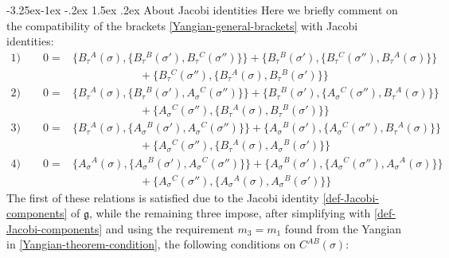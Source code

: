 \documentclass[12pt]{article}
\makeatletter
\renewcommand\subsection{\@startsection{subsection}{2}{\z@}%
                                     {-3.25ex\@plus -1ex \@minus -.2ex}%
                                     {1.5ex \@plus .2ex}%
                                     {\normalfont\bfseries}}
\numberwithin{equation}{section}
\makeatother
\begin{document}
\subsection{About Jacobi identities}
Here we briefly comment on the compatibility of the brackets \eqref{Yangian-general-brackets} with Jacobi identities:
\begin{equation}
\begin{aligned}
1)\qquad 0=&\bigl\{B_{\tau}{}^{A}(\sigma),\{B_{\tau}{}^{B}(\sigma'),B_{\tau}{}^{C}(\sigma'') \}\bigr\}+\bigl\{B_{\tau}{}^{B}(\sigma'),\{B_{\tau}{}^{C}(\sigma''),B_{\tau}{}^{A}(\sigma) \}\bigr\}
\\
& \qquad \qquad \qquad 
+\bigl\{B_{\tau}{}^{C}(\sigma''),\{B_{\tau}{}^{A}(\sigma),B_{\tau}{}^{B}(\sigma') \}\bigr\}
\\
2)\qquad 0=&\bigl\{B_{\tau}{}^{A}(\sigma),\{B_{\tau}{}^{B}(\sigma'),A_{\sigma}{}^{C}(\sigma'') \}\bigr\}+\bigl\{B_{\tau}{}^{B}(\sigma'),\{A_{\sigma}{}^{C}(\sigma''),B_{\tau}{}^{A}(\sigma) \}\bigr\}
\\
& \qquad \qquad \qquad 
+\bigl\{A_{\sigma}{}^{C}(\sigma''),\{B_{\tau}{}^{A}(\sigma),B_{\tau}{}^{B}(\sigma') \}\bigr\}
\\
3) \qquad 0=&\bigl\{B_{\tau}{}^{A}(\sigma),\{A_{\sigma}{}^{B}(\sigma'),A_{\sigma}{}^{C}(\sigma'') \}\bigr\}+\bigl\{A_{\sigma}{}^{B}(\sigma'),\{A_{\sigma}{}^{C}(\sigma''),B_{\tau}{}^{A}(\sigma) \}\bigr\}
\\
& \qquad \qquad \qquad 
+\bigl\{A_{\sigma}{}^{C}(\sigma''),\{B_{\tau}{}^{A}(\sigma),A_{\sigma}{}^{B}(\sigma') \}\bigr\}
\\
4)\qquad 0=&\bigl\{A_{\sigma}{}^{A}(\sigma),\{A_{\sigma}{}^{B}(\sigma'),A_{\sigma}{}^{C}(\sigma'') \}\bigr\}+\bigl\{A_{\sigma}{}^{B}(\sigma'),\{A_{\sigma}{}^{C}(\sigma''),A_{\sigma}{}^{A}(\sigma) \}\bigr\}
\\
& \qquad \qquad \qquad 
+\bigl\{A_{\sigma}{}^{C}(\sigma''),\{A_{\sigma}{}^{A}(\sigma),A_{\sigma}{}^{B}(\sigma') \}\bigr\}
\end{aligned}
\end{equation}
The first of these relations is satisfied due to the Jacobi identity \eqref{def-Jacobi-components} of $\mathfrak{g}$, while the remaining three impose, after simplifying with \eqref{def-Jacobi-components} and using the requirement $m_{3}=m_{1}$ found from the Yangian in \eqref{Yangian-theorem-condition}, the following conditions on $C^{AB}(\sigma)$:
\end{document}
